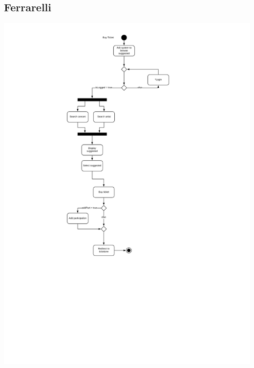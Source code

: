 \documentclass[11pt,a4paper]{article}
\begin{document}
\begin{itemize}
\subsection{Ferrarelli}
\includegraphics[scale=0.5]{hmwActivityDiagram.jpg}

\end{itemize}
\end{document}
